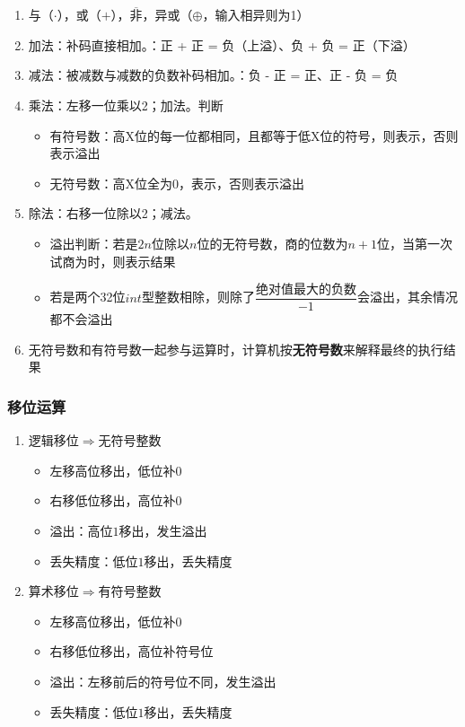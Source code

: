 \documentclass[./computer-organization-and-architecture.tex]{subfiles}
\begin{document}
    \begin{enumerate}
        \item 与（$\cdot$），或（$+$），$\overline{\text{非}}$，异或（$\oplus$，输入相异则为1）
        \item 加法：补码直接相加。{\color{red}{溢出}}：正 + 正 = 负（上溢）、负 + 负 = 正（下溢）
        \item 减法：被减数与减数的负数补码相加。{\color{red}{溢出}}：负 - 正 = 正、正 - 负 = 负
        \item 乘法：左移一位乘以2；加法。{\color{red}{溢出}}判断
        \begin{itemize}
            \item 有符号数：高X位的每一位都相同，且都等于低X位的符号，则表示{\color{red}{不溢出}}，否则表示溢出
            \item 无符号数：高X位全为0，表示{\color{red}{不溢出}}，否则表示溢出
        \end{itemize}
        \item 除法：右移一位除以2；减法。
        \begin{itemize}
            \item 溢出判断：若是$2n$位除以$n$位的无符号数，商的位数为$n + 1$位，当第一次试商为{\color{red}{1}}时，则表示结果{\color{red}{溢出}}
            \item 若是两个32位$int$型整数相除，则除了$\dfrac{\textbf{绝对值最大的负数}}{-1}$会溢出，其余情况都不会溢出
        \end{itemize}
        \item 无符号数和有符号数一起参与运算时，计算机按\textbf{无符号数}来解释最终的执行结果
    \end{enumerate}

    \subsubsection{移位运算}

    \begin{enumerate}
        \item 逻辑移位$\Rightarrow$无符号整数
        \begin{itemize}
            \item 左移高位移出，低位补0
            \item 右移低位移出，高位补0
            \item {\color{red}溢出}：高位$1$移出，发生溢出
            \item {\color{red}丢失精度}：低位$1$移出，丢失精度
        \end{itemize}
        \item 算术移位$\Rightarrow$有符号整数
        \begin{itemize}
            \item 左移高位移出，低位补0
            \item 右移低位移出，高位补{\color{red}符号位}
            \item {\color{red}溢出}：左移前后的符号位不同，发生溢出
            \item {\color{red}丢失精度}：低位$1$移出，丢失精度
        \end{itemize}
    \end{enumerate}
\end{document}

